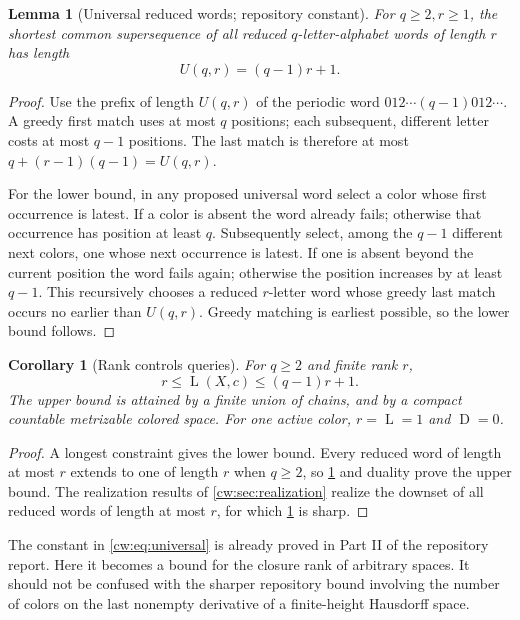 \documentclass[11pt,letterpaper]{article}
\numberwithin{equation}{section}
\newtheorem{lemma}[lemma]{Lemma}
\newtheorem{corollary}[corollary]{Corollary}
\theoremstyle{definition}
\theoremstyle{remark}
\theoremstyle{definition}
\newcommand{\depth}{\operatorname{D}}
\newcommand{\layers}{\operatorname{L}}
\begin{document}
\begin{lemma}[Universal reduced words; repository constant]
\label{cw:lem:universal}
For $q\ge2,r\ge1$, the shortest common supersequence of \emph{all} reduced
$q$-letter-alphabet words of length $r$ has length
\begin{equation}\label{cw:eq:universal}
 U(q,r)=(q-1)r+1.
\end{equation}
\end{lemma}
\begin{proof}
Use the prefix of length $U(q,r)$ of the periodic word
$012\cdots(q-1)012\cdots$. A greedy first match uses at most $q$ positions;
each subsequent, different letter costs at most $q-1$ positions. The last
match is therefore at most $q+(r-1)(q-1)=U(q,r)$.

For the lower bound, in any proposed universal word select a color whose
first occurrence is latest. If a color is absent the word already fails;
otherwise that occurrence has position at least $q$. Subsequently select,
among the $q-1$ different next colors, one whose next occurrence is latest.
If one is absent beyond the current position the word fails again; otherwise
the position increases by at least $q-1$. This recursively chooses a reduced
$r$-letter word whose greedy last match occurs no earlier than $U(q,r)$.
Greedy matching is earliest possible, so the lower bound follows.
\end{proof}

\begin{corollary}[Rank controls queries]\label{cw:cor:rankbounds}
For $q\ge2$ and finite rank $r$,
\begin{equation}\label{cw:eq:rankbounds}
 r\le \layers(X,c)\le(q-1)r+1.
\end{equation}
The upper bound is attained by a finite union of chains, and by a compact
countable metrizable colored space. For one active color, $r=\layers=1$ and
$\depth=0$.
\end{corollary}
\begin{proof}
A longest constraint gives the lower bound. Every reduced word of length at
most $r$ extends to one of length $r$ when $q\ge2$, so \cref{cw:lem:universal}
and duality prove the upper bound. The realization results of
\cref{cw:sec:realization} realize the downset of all reduced words of length
at most $r$, for which \cref{cw:lem:universal} is sharp.
\end{proof}

The constant in \eqref{cw:eq:universal} is already proved in Part II of the
repository report. Here it becomes a bound for the closure rank of arbitrary
spaces. It should not be confused with the sharper repository bound involving
the number of colors on the last nonempty derivative of a finite-height
Hausdorff space.
\end{document}

